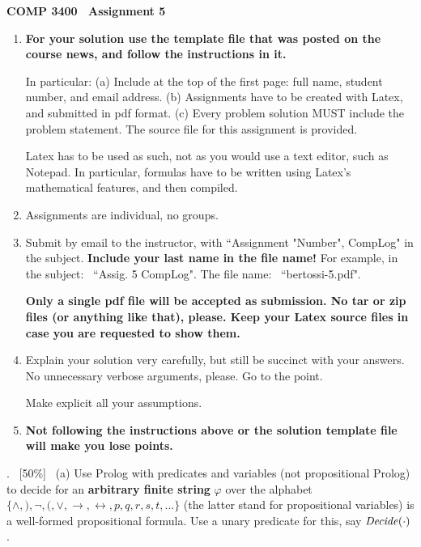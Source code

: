\documentclass[fullapage,12pt]{article}
\newcommand{\nit}[1]{{\it #1}}
\begin{document}
\thispagestyle{empty}

\vspace*{-3.5cm}
\begin{center} \bf \large COMP 3400~ Assignment 5
\end{center}

{\small {}
\begin{enumerate}
\item {\bf \Large For your solution use the template file that was posted on the course news, and follow the instructions in it.}

In particular: (a) Include at the top of the first page: full name, student number, and email address.
(b) Assignments have to be created with Latex, and submitted in pdf format. (c) Every problem solution MUST include
the problem statement. The source file for this assignment is provided.

Latex has to be used as such, not as you would use a text editor, such as Notepad. In particular,  formulas have to be written using Latex's mathematical
features, and then compiled.

\item Assignments are individual, no groups.
\item  %
Submit by email to the instructor, with ``Assignment "Number", CompLog" in the subject. {\bf Include your last name in the file name!} For example,
in the subject: \ ``Assig. 5 CompLog". The file name: \ ``bertossi-5.pdf".

{\bf Only a single pdf file will be accepted as submission. No tar or zip files (or anything like that), please. Keep your Latex source files in case you are requested to show them.}

\item Explain your solution very carefully, but still be succinct with your answers. No unnecessary verbose arguments, please. Go to the point.

Make explicit all your assumptions.

\item {\bf Not following the instructions above or the solution template file will make you lose points.}
\end{enumerate}}


. \ [50\%] \ (a) Use Prolog with predicates and variables (not propositional Prolog) to decide
for an {\bf arbitrary finite string} $\varphi$ over the alphabet $\{\wedge, ), \neg, (, \vee, \rightarrow, \leftrightarrow, p, q, r, s, t, ...\}$ (the latter stand for propositional variables) is  a well-formed
propositional formula. Use a unary predicate
for this, say $\nit{Decide}(\cdot)$.
\end{document}
